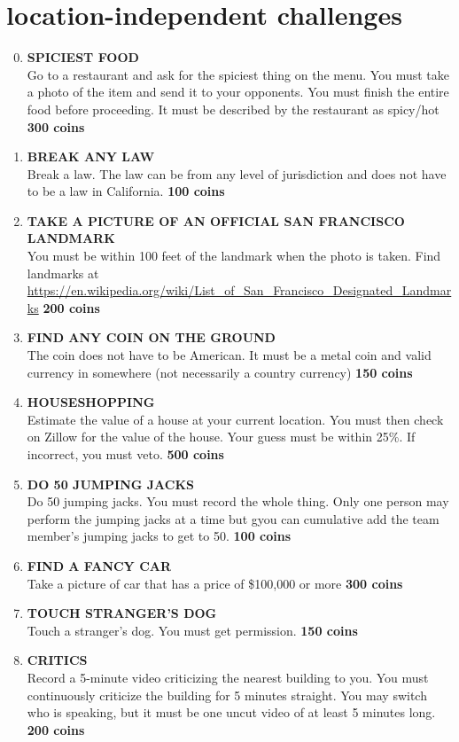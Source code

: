 \documentclass{article}
\begin{document}
\section{location-independent challenges}
\begin{enumerate}
    \setcounter{enumi}{-1}
    \item \textbf{SPICIEST FOOD} \\ Go to a restaurant and ask for the spiciest thing on the menu. You must take a photo of the item and send it to your opponents. You must finish the entire food before proceeding. It must be described by the restaurant as spicy/hot  \textbf{300 coins}
    \item \textbf{BREAK ANY LAW} \\ Break a law. The law can be from any level of jurisdiction and does not have to be a law in California. \textbf{100 coins}
    \item \textbf{TAKE A PICTURE OF AN OFFICIAL SAN FRANCISCO LANDMARK} \\ You must be within 100 feet of the landmark when the photo is taken. Find landmarks at \url{https://en.wikipedia.org/wiki/List_of_San_Francisco_Designated_Landmarks} \textbf{200 coins}
    \item \textbf{FIND ANY COIN ON THE GROUND} \\ The coin does not have to be American. It must be a metal coin and valid currency in somewhere (not necessarily a country currency) \textbf{150 coins}
    \item \textbf{HOUSESHOPPING}\\ Estimate the value of a house at your current location. You must then check on Zillow for the value of the house. Your guess must be within 25\%. If incorrect, you must veto. \textbf{500 coins}
    \item \textbf{DO 50 JUMPING JACKS} \\ Do 50 jumping jacks. You must record the whole thing. Only one person may perform the jumping jacks at a time but gyou can cumulative add the team member's jumping jacks to get to 50. \textbf{100 coins}
    \item \textbf{FIND A FANCY CAR} \\ Take a picture of car that has a price of \$100,000 or more \textbf{300 coins}
    \item \textbf{TOUCH STRANGER'S DOG} \\ Touch a stranger's dog. You must get permission. \textbf{150 coins}
    \item \textbf{CRITICS} \\ Record a 5-minute video criticizing the nearest building to you. You must continuously criticize the building for 5 minutes straight. You may switch who is speaking, but it must be one uncut video of at least 5 minutes long. \textbf{200 coins}

\end{enumerate}
\end{document}
